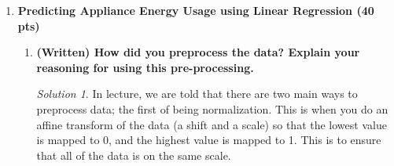\documentclass[a4paper,12pt]{article}
\theoremstyle{definition}
\theoremstyle{remark}
\newtheorem*{solution}{Solution}
\begin{document}
\begin{enumerate}
\begin{proof}
		\begin{align}
			\bfC^\top\bfC \mathbf{\beta} = \bfC^\top\bfY &\implies \begin{pmatrix}
				\bfX\\
				\sqrt{\lambda}\bfI
			\end{pmatrix}^\top\begin{pmatrix}
				\bfX\\
				\sqrt{\lambda}\bfI
			\end{pmatrix} \mathbf{\beta} = \begin{pmatrix}
			\bfX\\
			\sqrt{\lambda}\bfI
			\end{pmatrix}^\top \begin{pmatrix}
			\bfy\\
			\mathbf{0}
			\end{pmatrix}\\
			&\implies \begin{pmatrix}
				\bfX^\top &
				\sqrt{\lambda}\bfI^\top
			\end{pmatrix}\begin{pmatrix}
				\bfX\\
				\sqrt{\lambda}\bfI
			\end{pmatrix} \mathbf{\beta} = \begin{pmatrix}
				\bfX^\top&
				\sqrt{\lambda}\bfI^\top
			\end{pmatrix} \begin{pmatrix}
				\bfy\\
				\mathbf{0}
			\end{pmatrix}\\
			&\implies \left(\bfX^\top\bfX + \sqrt{\lambda}^2 \bfI^2\right) \mathbf{\beta}  = \bfX^\top\bfy + \sqrt{\lambda}\mathbf{0}\\
			&\implies \left(\bfX^\top\bfX + \lambda \bfI\right) \mathbf{\beta}  = \bfX^\top\bfy,
		\end{align} 
		which is precisely the regularized normal equations with regularization parameter $\lambda$.
	\end{proof}
	\item{\bf Predicting Appliance Energy Usage using Linear Regression (40 pts)}
	\begin{enumerate}
		\item {\bf (Written) How did you preprocess the data? Explain your reasoning for using this pre-processing.}
		\begin{solution}
			In lecture, we are told that there are two main ways to preprocess data; the first of being normalization. This is when you do an affine transform of the data (a shift and a scale) so that the lowest value is mapped to 0, and the highest value is mapped to 1. This is to ensure that all of the data is on the same scale.
			

\end{solution}
\end{enumerate}
\end{enumerate}
\end{document}
